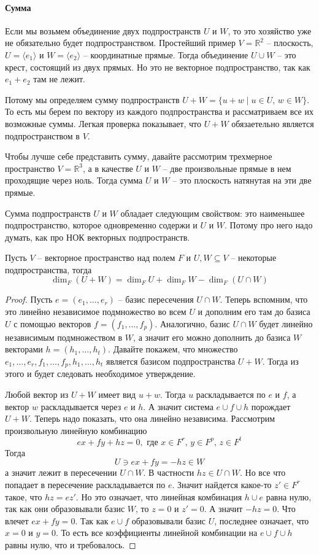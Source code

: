 \paragraph{Сумма}

Если мы возьмем объединение двух подпространств $U$ и $W$, то это хозяйство уже не обязательно будет подпространством.
Простейший пример $V = \mathbb R^2$ -- плоскость, $U = \langle e_1\rangle$ и $W = \langle e_2 \rangle$ -- координатные прямые.
Тогда объединение $U\cup W$ -- это крест, состоящий из двух прямых.
Но это не векторное подпространство, так как $e_1 + e_2$ там не лежит.

Потому мы определяем сумму подпространств $U + W = \{u + w\mid u\in U,\, w\in W\}$.
То есть мы берем по вектору из каждого подпространства и рассматриваем все их возможные суммы.
Легкая проверка показывает, что $U+W$ обязаетельно является подпространством в $V$.

Чтобы лучше себе представить сумму, давайте рассмотрим трехмерное пространство $V = \mathbb R^3$, а в качестве $U$ и $W$ -- две произвольные прямые в нем проходящие через ноль.
Тогда сумма $U$ и $W$ -- это плоскость натянутая на эти две прямые.

Сумма подпространств $U$ и $W$ обладает следующим свойством: это наименьшее подпространство, которое одновременно содержи и $U$ и $W$.
Потому про него надо думать, как про НОК векторных подпространств.

\begin{claim}
Пусть $V$ -- векторное пространство над полем $F$ и $U,W\subseteq V$ -- некоторые подпространства, тогда 
\[
\dim_F (U + W) = \dim_F U + \dim_F W - \dim_F (U\cap W)
\]
\end{claim}
\begin{proof}
Пусть $e=(e_1,\ldots,e_r)$ -- базис пересечения $U\cap W$.
Теперь вспомним, что это линейно независимое подмножество во всем $U$ и дополним его там до базиса $U$ с помощью векторов $f=(f_1,\ldots, f_p)$.
Аналогично, базис $U\cap W$ будет линейно независимым подмножеством в $W$, а значит его можно дополнить до базиса $W$ векторами $h=(h_1,\ldots,h_t)$.
Давайте покажем, что множество $e_1,\ldots,e_r, f_1,\ldots,f_p,h_1,\ldots,h_t$ является базисом подпространства $U + W$.
Тогда из этого и будет следовать необходимое утверждение.

Любой вектор из $U+W$ имеет вид $u+w$.
Тогда $u$ раскладывается по $e$ и $f$, а вектор $w$ раскладывается через $e$ и $h$.
А значит система $e\cup f\cup h$ порождает $U + W$.
Теперь надо показать, что она линейно независима.
Рассмотрим произвольную линейную комбинацию
\[
e x + fy + hz = 0, \text{ где }x\in F^r,\, y\in F^p,\, z\in F^t
\]
Тогда
\[
U \ni ex +fy = -hz \in W
\]
а значит лежит в пересечении $U\cap W$.
В частности $hz \in U\cap W$.
Но все что попадает в пересечение раскладывается по $e$.
Значит найдется какое-то $z'\in F^r$ такое, что $hz = ez'$.
Но это означает, что линейная комбинация $h\cup e$ равна нулю, так как они образовывали базис $W$, то $z =0$ и $z' = 0$.
А значит $-hz = 0$.
Что влечет $ex + fy = 0$.
Так как $e \cup f$ образовывали базис $U$, последнее означает, что $x = 0$ и $y = 0$.
То есть все коэффициенты линейной комбинации на $e\cup f\cup h$ равны нулю, что и требовалось.
\end{proof}



